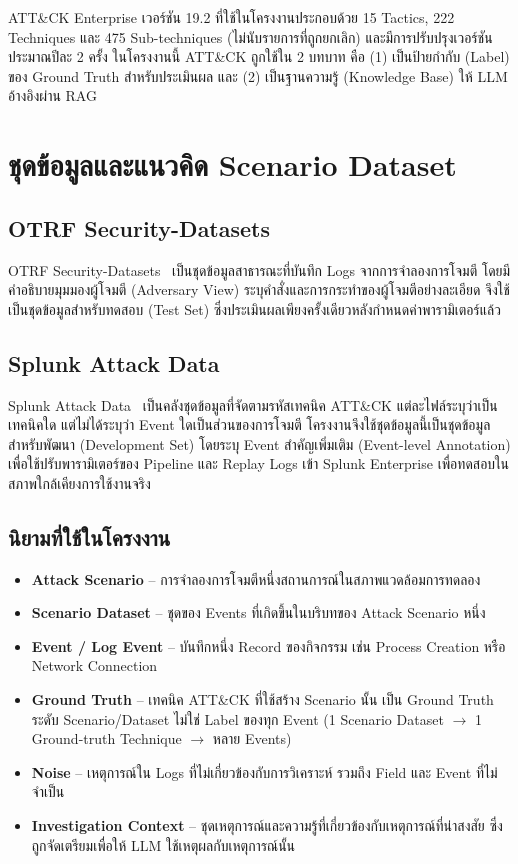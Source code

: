 ATT\&CK Enterprise เวอร์ชัน 19.2 ที่ใช้ในโครงงานประกอบด้วย 15 Tactics, 222 Techniques
และ 475 Sub-techniques (ไม่นับรายการที่ถูกยกเลิก) และมีการปรับปรุงเวอร์ชันประมาณปีละ 2 ครั้ง
ในโครงงานนี้ ATT\&CK ถูกใช้ใน 2 บทบาท คือ (1) เป็นป้ายกำกับ (Label) ของ Ground Truth สำหรับประเมินผล
และ (2) เป็นฐานความรู้ (Knowledge Base) ให้ LLM อ้างอิงผ่าน RAG

\section{ชุดข้อมูลและแนวคิด Scenario Dataset}

\subsection{OTRF Security-Datasets}
OTRF Security-Datasets~\cite{otrf-security-datasets} เป็นชุดข้อมูลสาธารณะที่บันทึก Logs จากการจำลองการโจมตี
โดยมีคำอธิบายมุมมองผู้โจมตี (Adversary View) ระบุคำสั่งและการกระทำของผู้โจมตีอย่างละเอียด
จึงใช้เป็นชุดข้อมูลสำหรับทดสอบ (Test Set) ซึ่งประเมินผลเพียงครั้งเดียวหลังกำหนดค่าพารามิเตอร์แล้ว

\subsection{Splunk Attack Data}
Splunk Attack Data~\cite{splunk-attack-data} เป็นคลังชุดข้อมูลที่จัดตามรหัสเทคนิค ATT\&CK
แต่ละไฟล์ระบุว่าเป็นเทคนิคใด แต่ไม่ได้ระบุว่า Event ใดเป็นส่วนของการโจมตี
โครงงานจึงใช้ชุดข้อมูลนี้เป็นชุดข้อมูลสำหรับพัฒนา (Development Set) โดยระบุ Event สำคัญเพิ่มเติม (Event-level Annotation) เพื่อใช้ปรับพารามิเตอร์ของ Pipeline และ Replay Logs เข้า Splunk Enterprise เพื่อทดสอบในสภาพใกล้เคียงการใช้งานจริง

\subsection{นิยามที่ใช้ในโครงงาน}
\begin{itemize}
  \item \textbf{Attack Scenario} -- การจำลองการโจมตีหนึ่งสถานการณ์ในสภาพแวดล้อมการทดลอง
  \item \textbf{Scenario Dataset} -- ชุดของ Events ที่เกิดขึ้นในบริบทของ Attack Scenario หนึ่ง
  \item \textbf{Event / Log Event} -- บันทึกหนึ่ง Record ของกิจกรรม เช่น Process Creation หรือ Network Connection
  \item \textbf{Ground Truth} -- เทคนิค ATT\&CK ที่ใช้สร้าง Scenario นั้น
        เป็น Ground Truth ระดับ Scenario/Dataset ไม่ใช่ Label ของทุก Event
        (1 Scenario Dataset $\rightarrow$ 1 Ground-truth Technique $\rightarrow$ หลาย Events)
  \item \textbf{Noise} -- เหตุการณ์ใน Logs ที่ไม่เกี่ยวข้องกับการวิเคราะห์ รวมถึง Field และ Event ที่ไม่จำเป็น
  \item \textbf{Investigation Context} -- ชุดเหตุการณ์และความรู้ที่เกี่ยวข้องกับเหตุการณ์ที่น่าสงสัย
        ซึ่งถูกจัดเตรียมเพื่อให้ LLM ใช้เหตุผลกับเหตุการณ์นั้น
\end{itemize}

